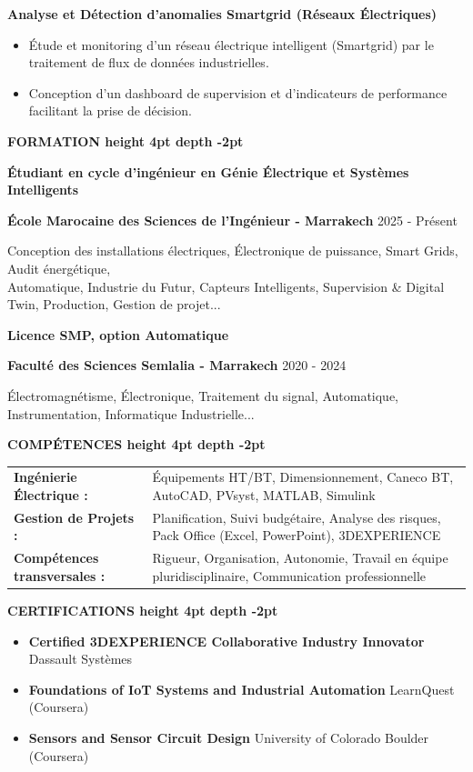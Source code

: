 \documentclass[10pt,a4paper]{../../templates/altacv}
\renewcommand{\cvsection}[2][]{%
  \vspace{3pt}%
  {\color{heading}\LARGE\bfseries #2 \hspace{0.2em}\leaders\vrule height 4pt depth -2pt\hfill\mbox{}}\par\vspace{2pt}
}
\renewcommand{\cvevent}[4]{%
  {\large\bfseries\color{accent}#1\par}
  \vspace{1pt}\normalsize
  \ifstrequal{#2}{}{}{%
    \textbf{\color{emphasis}#2\ifstrequal{#4}{}{}{ - #4}}%
  }%
  \hfill
  \ifstrequal{#3}{}{}{{\small#3}}%
  \par\vspace{1pt}
}
\begin{document}
{\large\bfseries\color{accent} Analyse et Détection d'anomalies Smartgrid (Réseaux Électriques)}\\[0.05cm]
\begin{itemize}
  \item Étude et monitoring d'un réseau électrique intelligent (Smartgrid) par le traitement de flux de données industrielles.
  \item Conception d'un dashboard de supervision et d'indicateurs de performance facilitant la prise de décision.
\end{itemize}


\cvsection{FORMATION}
\cvevent{Étudiant en cycle d'ingénieur en Génie Électrique et Systèmes Intelligents}{École Marocaine des Sciences de l'Ingénieur}{2025 - Présent}{Marrakech}
\small Conception des installations électriques, Électronique de puissance, Smart Grids, Audit énergétique,\\
\small Automatique, Industrie du Futur, Capteurs Intelligents, Supervision \& Digital Twin, Production, Gestion de projet...

\cvevent{Licence SMP, option Automatique}{Faculté des Sciences Semlalia}{2020 - 2024}{Marrakech}
\small Électromagnétisme, Électronique, Traitement du signal, Automatique, Instrumentation, Informatique Industrielle...

\cvsection{COMPÉTENCES}
\begin{tabular}{@{}ll@{}}
\textbf{Ingénierie Électrique :} & Équipements HT/BT, Dimensionnement, Caneco BT, AutoCAD, PVsyst, MATLAB, Simulink \\[2pt]
\textbf{Gestion de Projets :} & Planification, Suivi budgétaire, Analyse des risques, Pack Office (Excel, PowerPoint), 3DEXPERIENCE \\[2pt]
\textbf{Compétences transversales :} & Rigueur, Organisation, Autonomie, Travail en équipe pluridisciplinaire, Communication professionnelle \\
\end{tabular}

\cvsection{CERTIFICATIONS}
\begin{itemize}[leftmargin=*, label=\textbullet, itemsep=2pt]
  \item \textbf{Certified 3DEXPERIENCE Collaborative Industry Innovator} \hfill {\color{emphasis}Dassault Systèmes}
  \item \textbf{Foundations of IoT Systems and Industrial Automation} \hfill {\color{emphasis}LearnQuest (Coursera)}
  \item \textbf{Sensors and Sensor Circuit Design} \hfill {\color{emphasis}University of Colorado Boulder (Coursera)}
\end{itemize}
\end{document}
